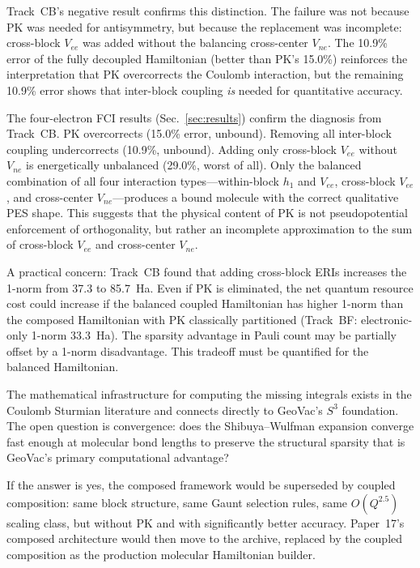 \documentclass[aps,pra,twocolumn,superscriptaddress,longbibliography]{revtex4-2}
\begin{document}
Track~CB's negative result confirms this distinction.  The failure
was not because PK was needed for antisymmetry, but because the
replacement was incomplete: cross-block $V_{ee}$ was added without
the balancing cross-center $V_{ne}$.  The 10.9\% error of the fully
decoupled Hamiltonian (better than PK's 15.0\%) reinforces the
interpretation that PK overcorrects the Coulomb interaction, but the
remaining 10.9\% error shows that inter-block coupling \emph{is}
needed for quantitative accuracy.

The four-electron FCI results (Sec.~\ref{sec:results}) confirm the
diagnosis from Track~CB.  PK overcorrects (15.0\% error, unbound).
Removing all inter-block coupling undercorrects (10.9\%, unbound).
Adding only cross-block $V_{ee}$ without $V_{ne}$ is energetically
unbalanced (29.0\%, worst of all).  Only the balanced combination of
all four interaction types---within-block $h_1$ and $V_{ee}$,
cross-block $V_{ee}$, and cross-center $V_{ne}$---produces a bound
molecule with the correct qualitative PES shape.  This suggests that
the physical content of PK is not pseudopotential enforcement of
orthogonality, but rather an incomplete approximation to the sum of
cross-block $V_{ee}$ and cross-center $V_{ne}$.

A practical concern: Track~CB found that adding cross-block ERIs
increases the 1-norm from 37.3 to 85.7~Ha.  Even if PK is
eliminated, the net quantum resource cost could increase if the
balanced coupled Hamiltonian has higher 1-norm than the composed
Hamiltonian with PK classically partitioned (Track~BF: electronic-only
1-norm 33.3~Ha).  The sparsity advantage in Pauli count may be
partially offset by a 1-norm disadvantage.  This tradeoff must be
quantified for the balanced Hamiltonian.

The mathematical infrastructure for computing the missing integrals
exists in the Coulomb Sturmian literature and connects directly to
GeoVac's $S^3$ foundation.  The open question is convergence: does
the Shibuya--Wulfman expansion converge fast enough at molecular bond
lengths to preserve the structural sparsity that is GeoVac's primary
computational advantage?

If the answer is yes, the composed framework would be superseded by
coupled composition: same block structure, same Gaunt selection
rules, same $O(Q^{2.5})$ scaling class, but without PK and with
significantly better accuracy.  Paper~17's composed architecture
would then move to the archive, replaced by the coupled composition
as the production molecular Hamiltonian builder.
\end{document}
